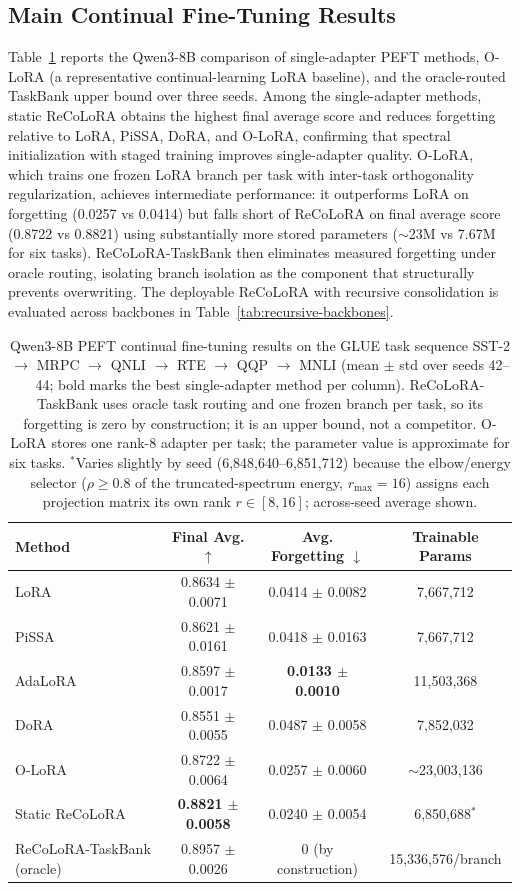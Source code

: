 \documentclass[11pt]{article}
\begin{document}
\subsection{Main Continual Fine-Tuning Results}
Table~\ref{tab:qwen3-main} reports the Qwen3-8B comparison of single-adapter PEFT methods, O-LoRA (a representative continual-learning LoRA baseline), and the oracle-routed TaskBank upper bound over three seeds. Among the single-adapter methods, static ReCoLoRA obtains the highest final average score and reduces forgetting relative to LoRA, PiSSA, DoRA, and O-LoRA, confirming that spectral initialization with staged training improves single-adapter quality. O-LoRA, which trains one frozen LoRA branch per task with inter-task orthogonality regularization, achieves intermediate performance: it outperforms LoRA on forgetting (0.0257 vs 0.0414) but falls short of ReCoLoRA on final average score (0.8722 vs 0.8821) using substantially more stored parameters ($\sim$23M vs 7.67M for six tasks). ReCoLoRA-TaskBank then eliminates measured forgetting under oracle routing, isolating branch isolation as the component that structurally prevents overwriting. The deployable ReCoLoRA with recursive consolidation is evaluated across backbones in Table~\ref{tab:recursive-backbones}.

\begin{table}[t]
\centering
\begin{tabular}{lccc}
\toprule
Method & Final Avg. $\uparrow$ & Avg. Forgetting $\downarrow$ & Trainable Params \\
\midrule
LoRA & 0.8634 $\pm$ 0.0071 & 0.0414 $\pm$ 0.0082 & 7,667,712 \\
PiSSA & 0.8621 $\pm$ 0.0161 & 0.0418 $\pm$ 0.0163 & 7,667,712 \\
AdaLoRA & 0.8597 $\pm$ 0.0017 & \textbf{0.0133 $\pm$ 0.0010} & 11,503,368 \\
DoRA & 0.8551 $\pm$ 0.0055 & 0.0487 $\pm$ 0.0058 & 7,852,032 \\
O-LoRA & 0.8722 $\pm$ 0.0064 & 0.0257 $\pm$ 0.0060 & $\sim$23,003,136 \\
\midrule
Static ReCoLoRA & \textbf{0.8821 $\pm$ 0.0058} & 0.0240 $\pm$ 0.0054 & 6,850,688$^{*}$ \\
\midrule
ReCoLoRA-TaskBank (oracle) & 0.8957 $\pm$ 0.0026 & 0 (by construction) & 15,336,576/branch \\
\bottomrule
\end{tabular}
\caption{Qwen3-8B PEFT continual fine-tuning results on the GLUE task sequence SST-2 $\rightarrow$ MRPC $\rightarrow$ QNLI $\rightarrow$ RTE $\rightarrow$ QQP $\rightarrow$ MNLI (mean $\pm$ std over seeds 42--44; bold marks the best single-adapter method per column). ReCoLoRA-TaskBank uses oracle task routing and one frozen branch per task, so its forgetting is zero by construction; it is an upper bound, not a competitor. O-LoRA stores one rank-8 adapter per task; the parameter value is approximate for six tasks. $^{*}$Varies slightly by seed (6,848,640--6,851,712) because the elbow/energy selector ($\rho \geq 0.8$ of the truncated-spectrum energy, $r_{\max}=16$) assigns each projection matrix its own rank $r\in[8,16]$; across-seed average shown.}
\label{tab:qwen3-main}
\end{table}
\end{document}
